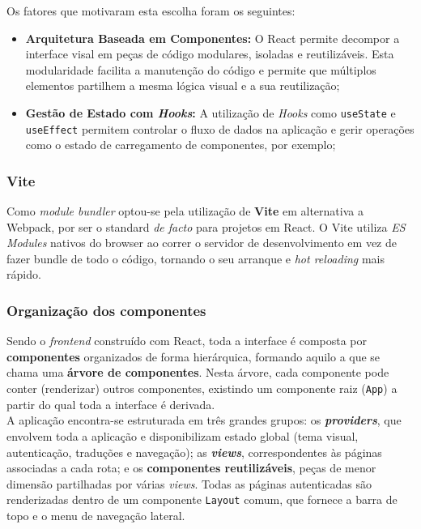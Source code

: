 Os fatores que motivaram esta escolha foram os seguintes:

\begin{itemize}
	\item \textbf{Arquitetura Baseada em Componentes:} O React permite decompor a interface visal em peças de código modulares, isoladas e reutilizáveis. Esta modularidade facilita a manutenção do código e permite que múltiplos elementos partilhem a mesma lógica visual e a sua reutilização;
	
	\item \textbf{Gestão de Estado com \textit{Hooks}:} A utilização de \textit{Hooks} como \texttt{useState} e \texttt{useEffect} permitem controlar o fluxo de dados na aplicação e gerir operações como o estado de carregamento de componentes, por exemplo;
\end{itemize}

\subsubsection{Vite}
Como \textit{module bundler} optou-se pela utilização de \textbf{Vite} em alternativa a Webpack, por ser o standard \textit{de facto} para projetos em React. O Vite utiliza \textit{ES Modules} nativos do browser ao correr o servidor de desenvolvimento em vez de fazer bundle de todo o código, tornando o seu arranque e \textit{hot reloading} mais rápido. \\

\subsubsection{Organização dos componentes}
Sendo o \textit{frontend} construído com React, toda a interface é composta
por \textbf{componentes} organizados de forma hierárquica, formando aquilo a
que se chama uma \textbf{árvore de componentes}. Nesta árvore, cada componente
pode conter (renderizar) outros componentes, existindo um componente raiz
(\texttt{App}) a partir do qual toda a interface é derivada. \\

A aplicação encontra-se estruturada em três grandes grupos: os
\textbf{\textit{providers}}, que envolvem toda a aplicação e disponibilizam
estado global (tema visual, autenticação, traduções e navegação); as
\textbf{\textit{views}}, correspondentes às páginas associadas a cada rota; e os
\textbf{componentes reutilizáveis}, peças de menor dimensão partilhadas por
várias \textit{views}. Todas as páginas autenticadas são renderizadas dentro
de um componente \texttt{Layout} comum, que fornece a barra de topo e o menu
de navegação lateral. \\

